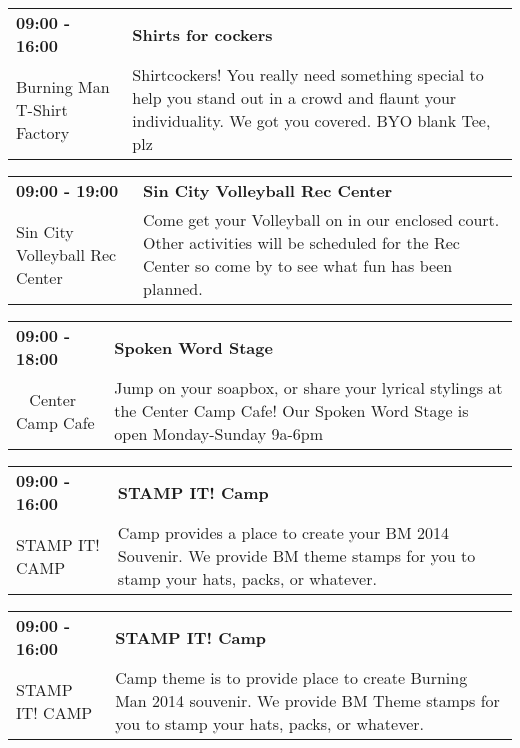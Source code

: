 \begin{tabular}{ p{1in} p{2.2in} }
    \textbf{09:00 - 16:00} & \textbf{Shirts for cockers} \\
    Burning Man T-Shirt Factory \newline  & Shirtcockers! You really need something special to help you stand out in a crowd and flaunt your individuality. We got you covered. BYO blank Tee, plz \\
    \hline 
\end{tabular}
    
\begin{tabular}{ p{1in} p{2.2in} }
    \textbf{09:00 - 19:00} & \textbf{Sin City Volleyball Rec Center} \\
    Sin City Volleyball Rec Center \newline  & Come get your Volleyball on in our enclosed court. Other activities will be scheduled for the Rec Center so come by to see what fun has been planned. \\
    \hline 
\end{tabular}
    
\begin{tabular}{ p{1in} p{2.2in} }
    \textbf{09:00 - 18:00} & \textbf{Spoken Word Stage} \\
    ~ \newline Center Camp Cafe & Jump on your soapbox, or share your lyrical stylings at the Center Camp Cafe! Our Spoken Word Stage is open Monday-Sunday 9a-6pm \\
    \hline 
\end{tabular}
    
\begin{tabular}{ p{1in} p{2.2in} }
    \textbf{09:00 - 16:00} & \textbf{STAMP IT! Camp} \\
    STAMP IT! CAMP \newline  & Camp provides a place to create your BM 2014 Souvenir. We provide BM theme stamps for you to stamp your hats, packs, or whatever. \\
    \hline 
\end{tabular}
    
\begin{tabular}{ p{1in} p{2.2in} }
    \textbf{09:00 - 16:00} & \textbf{STAMP IT! Camp} \\
    STAMP IT! CAMP \newline  & Camp theme is to provide place to create Burning Man 2014 souvenir.  We provide BM Theme stamps for you to stamp your hats, packs, or whatever. \\
    \hline 
\end{tabular}
    
